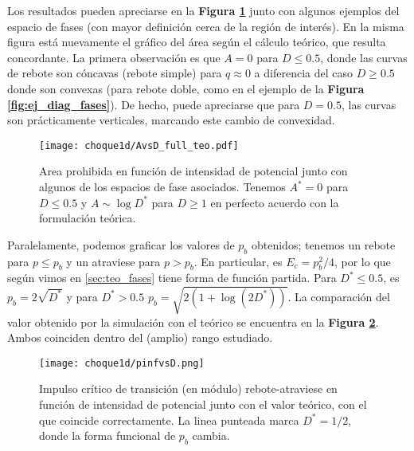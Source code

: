 Los resultados pueden apreciarse en la \textbf{Figura \ref{fig:AvsD}} junto con algunos ejemplos del espacio de fases (con mayor definición cerca de la región de interés).
En la misma figura está nuevamente el gráfico del área según el cálculo teórico, que resulta concordante.
La primera observación es que $A=0$ para $D\leq 0.5$, donde las curvas de rebote son cóncavas (rebote simple) para $q\approx 0$ a diferencia del caso $D\geq 0.5$ donde son convexas 
(para rebote doble, como en el ejemplo de la \textbf{Figura \ref{fig:ej_diag_fases}}). 
De hecho, puede apreciarse que para $D=0.5$, las curvas son prácticamente verticales, marcando este cambio de convexidad.

\begin{figure}[H]
	\centering
	\texttt{[image: choque1d/AvsD\_full\_teo.pdf]}
	\caption{Area prohibida en función de intensidad de potencial junto con algunos de los espacios de fase asociados. 
	Tenemos $A^*=0$ para $D\leq 0.5$ y $A\sim \log{D^*}$ para $D\geq 1$ en perfecto acuerdo con la formulación teórica.}
	\label{fig:AvsD}
\end{figure}

Paralelamente, podemos graficar los valores de $p_b$ obtenidos; tenemos un rebote para $p\leq p_b$ y un atraviese para $p>p_b$.
En particular, es $E_c = p_b^2/4$, por lo que según vimos en \ref{sec:teo_fases} tiene forma de función partida.
Para $D^*\leq 0.5$, es $p_b=2\sqrt{D^*}$ y para $D^*>0.5$ $p_b=\sqrt{2(1+\log(2D^*))}$.
La comparación del valor obtenido por la simulación con el teórico se encuentra en la \textbf{Figura \ref{fig:pbvsD}}.
Ambos coinciden dentro del (amplio) rango estudiado.

\begin{figure}[H]
	\centering
	\texttt{[image: choque1d/pinfvsD.png]}
	\caption{Impulso crítico de transición (en módulo) rebote-atraviese en función de intensidad de potencial junto con el valor teórico, con el que coincide
	correctamente. La linea punteada marca $D^*=1/2$, donde la forma funcional de $p_b$ cambia.}
	\label{fig:pbvsD}
\end{figure}






